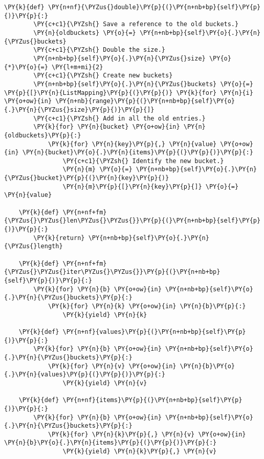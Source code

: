 \begin{Verbatim}[commandchars=\\\{\}]
    \PY{k}{def} \PY{n+nf}{\PYZus{}double}\PY{p}{(}\PY{n+nb+bp}{self}\PY{p}{)}\PY{p}{:}
        \PY{c+c1}{\PYZsh{} Save a reference to the old buckets.}
        \PY{n}{oldbuckets} \PY{o}{=} \PY{n+nb+bp}{self}\PY{o}{.}\PY{n}{\PYZus{}buckets}
        \PY{c+c1}{\PYZsh{} Double the size.}
        \PY{n+nb+bp}{self}\PY{o}{.}\PY{n}{\PYZus{}size} \PY{o}{*}\PY{o}{=} \PY{l+m+mi}{2}
        \PY{c+c1}{\PYZsh{} Create new buckets}
        \PY{n+nb+bp}{self}\PY{o}{.}\PY{n}{\PYZus{}buckets} \PY{o}{=} \PY{p}{[}\PY{n}{ListMapping}\PY{p}{(}\PY{p}{)} \PY{k}{for} \PY{n}{i} \PY{o+ow}{in} \PY{n+nb}{range}\PY{p}{(}\PY{n+nb+bp}{self}\PY{o}{.}\PY{n}{\PYZus{}size}\PY{p}{)}\PY{p}{]}
        \PY{c+c1}{\PYZsh{} Add in all the old entries.}
        \PY{k}{for} \PY{n}{bucket} \PY{o+ow}{in} \PY{n}{oldbuckets}\PY{p}{:}
            \PY{k}{for} \PY{n}{key}\PY{p}{,} \PY{n}{value} \PY{o+ow}{in} \PY{n}{bucket}\PY{o}{.}\PY{n}{items}\PY{p}{(}\PY{p}{)}\PY{p}{:}
                \PY{c+c1}{\PYZsh{} Identify the new bucket.}
                \PY{n}{m} \PY{o}{=} \PY{n+nb+bp}{self}\PY{o}{.}\PY{n}{\PYZus{}bucket}\PY{p}{(}\PY{n}{key}\PY{p}{)}
                \PY{n}{m}\PY{p}{[}\PY{n}{key}\PY{p}{]} \PY{o}{=} \PY{n}{value}

    \PY{k}{def} \PY{n+nf+fm}{\PYZus{}\PYZus{}len\PYZus{}\PYZus{}}\PY{p}{(}\PY{n+nb+bp}{self}\PY{p}{)}\PY{p}{:}
        \PY{k}{return} \PY{n+nb+bp}{self}\PY{o}{.}\PY{n}{\PYZus{}length}

    \PY{k}{def} \PY{n+nf+fm}{\PYZus{}\PYZus{}iter\PYZus{}\PYZus{}}\PY{p}{(}\PY{n+nb+bp}{self}\PY{p}{)}\PY{p}{:}
        \PY{k}{for} \PY{n}{b} \PY{o+ow}{in} \PY{n+nb+bp}{self}\PY{o}{.}\PY{n}{\PYZus{}buckets}\PY{p}{:}
            \PY{k}{for} \PY{n}{k} \PY{o+ow}{in} \PY{n}{b}\PY{p}{:}
                \PY{k}{yield} \PY{n}{k}

    \PY{k}{def} \PY{n+nf}{values}\PY{p}{(}\PY{n+nb+bp}{self}\PY{p}{)}\PY{p}{:}
        \PY{k}{for} \PY{n}{b} \PY{o+ow}{in} \PY{n+nb+bp}{self}\PY{o}{.}\PY{n}{\PYZus{}buckets}\PY{p}{:}
            \PY{k}{for} \PY{n}{v} \PY{o+ow}{in} \PY{n}{b}\PY{o}{.}\PY{n}{values}\PY{p}{(}\PY{p}{)}\PY{p}{:}
                \PY{k}{yield} \PY{n}{v}

    \PY{k}{def} \PY{n+nf}{items}\PY{p}{(}\PY{n+nb+bp}{self}\PY{p}{)}\PY{p}{:}
        \PY{k}{for} \PY{n}{b} \PY{o+ow}{in} \PY{n+nb+bp}{self}\PY{o}{.}\PY{n}{\PYZus{}buckets}\PY{p}{:}
            \PY{k}{for} \PY{n}{k}\PY{p}{,} \PY{n}{v} \PY{o+ow}{in} \PY{n}{b}\PY{o}{.}\PY{n}{items}\PY{p}{(}\PY{p}{)}\PY{p}{:}
                \PY{k}{yield} \PY{n}{k}\PY{p}{,} \PY{n}{v}


\end{Verbatim}
